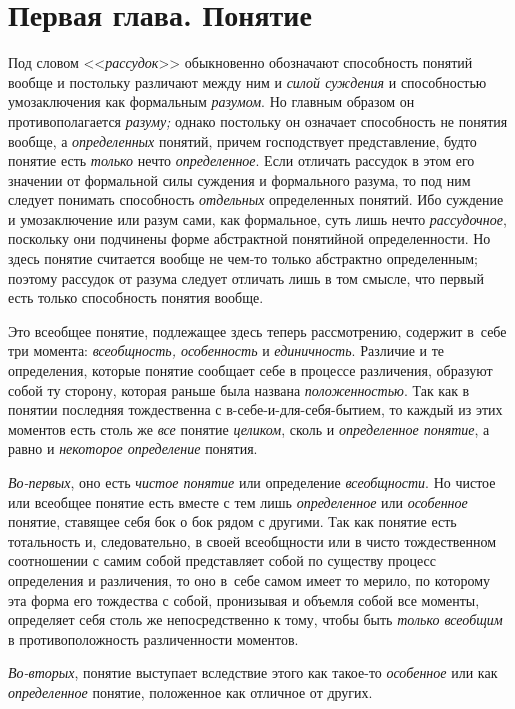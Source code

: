 \bigskip

\chapter[{\em Первая глава} Понятие]{Первая глава. Понятие}

Под словом <<{\em рассудок}>> обыкновенно обозначают способность
понятий вообще и постольку различают между
ним и {\em силой суждения} и способностью умозаключения как формальным
{\em разумом}. Но главным образом он противополагается
{\em разуму;} однако постольку он означает способность не понятия вообще, а
{\em определенных} понятий, причем господствует представление, будто понятие
есть {\em только} нечто {\em определенное}. Если
отличать рассудок в этом его значении от формальной силы суждения и
формального разума, то под ним следует понимать способность {\em отдельных}
определенных понятий. Ибо суждение и умозаключение или разум
сами, как формальное, суть лишь нечто {\em рассудочное},
поскольку они подчинены форме абстрактной понятийной
определенности. Но здесь понятие считается вообще не чем-то только
абстрактно определенным; поэтому рассудок от разума следует отличать лишь в
том смысле, что первый есть только способность понятия вообще.

Это всеобщее понятие, подлежащее здесь теперь рассмотрению,
содержит в~себе три момента: {\em всеобщность, особенность} и
{\em единичность}. Различие и те определения, которые понятие сообщает себе
в процессе различения, образуют собой ту сторону, которая раньше была названа
{\em положенностью}. Так
как в понятии последняя тождественна с в-себе-и-для-себя-бытием, то каждый
из этих моментов есть столь же {\em все} понятие {\em целиком}, сколь и
{\em определенное понятие}, а равно и {\em некоторое определение} понятия.

{\em Во-первых}, оно есть {\em чистое понятие} или определение
{\em всеобщности}. Но чистое или всеобщее понятие есть вместе с тем лишь
{\em определенное} или {\em особенное} понятие,
ставящее себя бок о бок рядом с другими. Так как понятие есть тотальность
и, следовательно, в своей всеобщности или в чисто тождественном соотношении
с самим собой представляет собой по существу процесс определения и
различения, то оно в~себе самом имеет то мерило, по которому эта форма его
тождества с собой, пронизывая и объемля собой все моменты, определяет себя
столь же непосредственно к тому, чтобы быть
{\em только всеобщим} в противоположность различенности моментов.

{\em Во-вторых}, понятие выступает вследствие этого как такое-то
{\em особенное} или как {\em определенное} понятие, положенное как
отличное от других.

